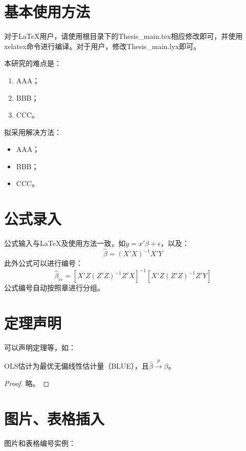 \documentclass{sufethesismas}
\begin{document}
\section{基本使用方法}

对于\LaTeX{}用户，请使用根目录下的Thesis\_main.tex相应修改即可，并使用xelatex命令进行编译。对于用户，修改Thesis\_main.lyx即可。


本研究的难点是：
\begin{enumerate}
	\item AAA；
	\item BBB；
	\item CCC。
\end{enumerate}

拟采用解决方法：
\begin{itemize}
	\item AAA；
	\item BBB；
	\item CCC。
\end{itemize}





\section{公式录入}

公式输入与\LaTeX{}及使用方法一致，如$y=x'\beta+\epsilon$，以及：
\[
\hat{\beta}=\left(X'X\right)^{-1}X'Y
\]
此外公式可以进行编号：
\begin{equation}
\hat{\beta}_{iv}=\left[X'Z\left(Z'Z\right)^{-1}Z'X\right]^{-1}\left[X'Z\left(Z'Z\right)^{-1}Z'Y\right]
\end{equation}
公式编号自动按照章进行分组。


\section{定理声明}

可以声明定理等，如：
\begin{theorem}
OLS估计为最优无偏线性估计量（BLUE），且$\hat{\beta}\overset{p}{\rightarrow}\beta$。\end{theorem}
\begin{proof}
略。
\end{proof}


\section{图片、表格插入}

图片和表格编号实例：
\end{document}
